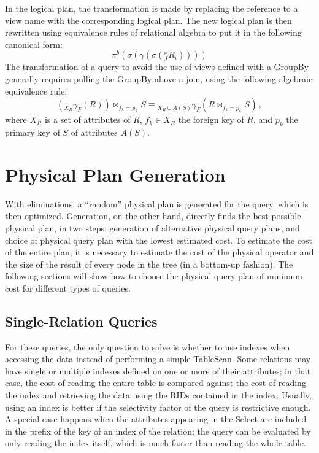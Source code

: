 In the logical plan, the transformation is made by replacing the reference to a view name with the corresponding logical plan. The new logical plan is then rewritten using equivalence rules of relational algebra to put it in the following canonical form:
\begin{equation*}
    \pi^b(\sigma(\gamma(\sigma(^{\bowtie}_J R_i))))
\end{equation*}
The transformation of a query to avoid the use of views defined with a GroupBy generally requires pulling the GroupBy above a join, using the following algebraic equivalence rule:
\begin{equation*}
    ({}_{X_R} \gamma_F(R)) \bowtie_{f_{k} = p_k} S \equiv {}_{X_R \cup A(S)} \gamma_F (R \bowtie_{f_{k} = p_k} S) \,,
\end{equation*}
where $X_R$ is a set of attributes of $R$, $f_k \in X_R$ the foreign key of $R$, and $p_k$ the primary key of $S$ of attributes $A(S)$.

\section{Physical Plan Generation}

With eliminations, a ``random'' physical plan is generated for the query, which is then optimized. Generation, on the other hand, directly finds the best possible physical plan, in two steps: generation of alternative physical query plans, and choice of physical query plan with the lowest estimated cost. To estimate the cost of the entire plan, it is necessary to estimate the cost of the physical operator and the size of the result of every node in the tree (in a bottom-up fashion). The following sections will show how to choose the physical query plan of minimum cost for different types of queries.

\subsection{Single-Relation Queries}

For these queries, the only question to solve is whether to use indexes when accessing the data instead of performing a simple TableScan. Some relations may have single or multiple indexes defined on one or more of their attributes; in that case, the cost of reading the entire table is compared against the cost of reading the index and retrieving the data using the RIDs contained in the index. Usually, using an index is better if the selectivity factor of the query is restrictive enough. A special case happens when the attributes appearing in the Select are included in the prefix of the key of an index of the relation; the query can be evaluated by only reading the index itself, which is much faster than reading the whole table. 


